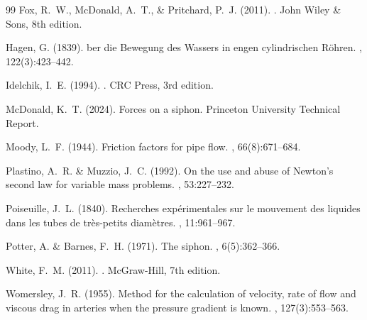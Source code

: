 \documentclass[11pt,a4paper]{article}
\theoremstyle{definition}
\begin{document}
\begin{thebibliography}{99}
Fox, R.~W., McDonald, A.~T., \& Pritchard, P.~J. (2011).
.
\newblock John Wiley \& Sons, 8th edition.

Hagen, G. (1839).
ber die {B}ewegung des {W}assers in engen cylindrischen {R}{\"o}hren.
, 122(3):423--442.

Idelchik, I.~E. (1994).
.
\newblock CRC Press, 3rd edition.

McDonald, K.~T. (2024).
\newblock Forces on a siphon.
\newblock Princeton University Technical Report.

Moody, L.~F. (1944).
\newblock Friction factors for pipe flow.
, 66(8):671--684.

Plastino, A.~R. \& Muzzio, J.~C. (1992).
\newblock On the use and abuse of {N}ewton's second law for variable mass problems.
, 53:227--232.

Poiseuille, J.~L. (1840).
\newblock Recherches exp\'{e}rimentales sur le mouvement des liquides dans les tubes de tr\`{e}s-petits diam\`{e}tres.
, 11:961--967.

Potter, A. \& Barnes, F.~H. (1971).
\newblock The siphon.
, 6(5):362--366.

White, F.~M. (2011).
.
\newblock McGraw-Hill, 7th edition.

Womersley, J.~R. (1955).
\newblock Method for the calculation of velocity, rate of flow and viscous drag in arteries when the pressure gradient is known.
, 127(3):553--563.

\end{thebibliography}
\end{document}
